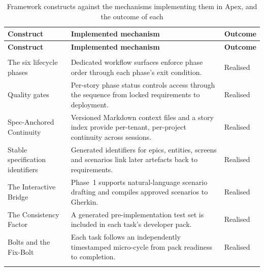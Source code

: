 {\footnotesize
\begin{longtable}{>{\raggedright\arraybackslash}p{3.2cm}
                  >{\raggedright\arraybackslash}p{7.5cm}
                  >{\raggedright\arraybackslash}p{3.7cm}}
\caption[Framework constructs against the mechanisms implementing them in Apex]{Framework constructs against the mechanisms implementing them in Apex, and the outcome of each}
\label{tab:apex_mapping} \\
\toprule
\textbf{Construct} & \textbf{Implemented mechanism} & \textbf{Outcome} \\
\midrule
\endfirsthead
\toprule
\textbf{Construct} & \textbf{Implemented mechanism} & \textbf{Outcome} \\
\midrule
\endhead

\midrule
\multicolumn{3}{r}{\textit{Continued on next page}}\\
\bottomrule
\endfoot

\bottomrule
\endlastfoot

The six lifecycle phases
& Dedicated workflow surfaces enforce phase order through each phase's exit condition.
& Realised \\ \addlinespace

Quality gates
& Per-story phase status controls access through the sequence from locked requirements to deployment.
& Realised \\ \addlinespace

Spec-Anchored Continuity
& Versioned Markdown context files and a story index provide per-tenant, per-project continuity across sessions.
& Realised \\ \addlinespace

Stable specification identifiers
& Generated identifiers for epics, entities, screens and scenarios link later artefacts back to requirements.
& Realised \\ \addlinespace

The Interactive Bridge
& Phase~1 supports natural-language scenario drafting and compiles approved scenarios to Gherkin.
& Realised \\ \addlinespace

The Consistency Factor
& A generated pre-implementation test set is included in each task's developer pack.
& Realised \\ \addlinespace

Bolts and the Fix-Bolt
& Each task follows an independently timestamped micro-cycle from pack readiness to completion.
& Realised \\ \addlinespace


\end{longtable}}
